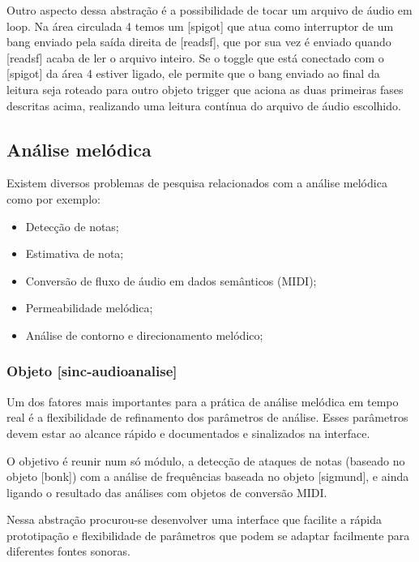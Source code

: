 \documentclass{ppgmus}
\begin{document}
Outro aspecto dessa abstração é a possibilidade de tocar um arquivo de áudio em loop.
Na área circulada 4 temos um [spigot] que atua como interruptor de um bang enviado pela
saída direita de [readsf\texttildelow], que por sua vez é enviado quando [readsf\texttildelow] 
acaba de ler o arquivo
inteiro. Se o toggle que está conectado com o [spigot] da área 4 estiver ligado, ele permite
que o bang enviado ao final da leitura seja roteado para outro objeto trigger que aciona as 
duas primeiras fases descritas acima, realizando uma leitura contínua do arquivo de áudio
escolhido.



\subsection{Análise melódica}


Existem diversos problemas de pesquisa relacionados com a
análise melódica como por exemplo:

\begin{itemize}
 \item Detecção de notas;
 \item Estimativa de nota;
 \item Conversão de fluxo de áudio em dados semânticos (MIDI);
 \item Permeabilidade melódica;
 \item Análise de contorno e direcionamento melódico;
\end{itemize}




\subsubsection{Objeto [sinc-audioanalise]}

Um dos fatores mais importantes para a prática de análise melódica
em tempo real é a flexibilidade de refinamento dos parâmetros
de análise. Esses parâmetros devem estar ao alcance rápido e documentados
e sinalizados na interface.

O objetivo é reunir num só módulo, a detecção de ataques de notas 
(baseado no objeto [bonk\texttildelow]) com a análise de frequências
baseada no objeto [sigmund\texttildelow], e ainda ligando o resultado das 
análises com objetos de conversão MIDI.


Nessa abstração procurou-se desenvolver uma interface que facilite
a rápida prototipação e flexibilidade de parâmetros que podem
se adaptar facilmente para diferentes fontes sonoras.
\end{document}
